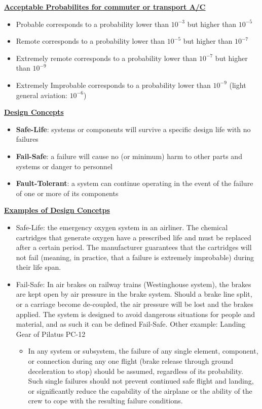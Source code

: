 \documentclass[9pt, landscape, fleqn]{scrartcl}
\begin{document}
\begin{multicols*}{3}
\begin{itemize}
\end{itemize}
\underline{\textbf{Acceptable Probabilites for commuter or transport A/C}}
\begin{itemize}
    \item Probable corresponds to a probability lower than $10^{-3}$ but higher than $10^{-5}$
    \item Remote corresponds to a probability lower than $10^{-5}$ but higher than $10^{-7}$
    \item Extremely remote corresponds to a probability lower than $10^{-7}$ but higher than $10^{-9}$
    \item Extremely Improbable corresponds to a probability lower than $10^{-9}$ (light general aviation: $10^{-6}$)
\end{itemize}
\underline{\textbf{Design Concepts}}
\begin{itemize}
    \item \textbf{Safe-Life}: systems or components will survive a specific design life with no failures
    \item \textbf{Fail-Safe}: a failure will cause no (or minimum) harm to other parts and systems or danger to
    personnel
    \item \textbf{Fault-Tolerant}: a system can continue operating in the event of the failure of one or more of its components
\end{itemize}
\underline{\textbf{Examples of Design Concetps}}
\begin{itemize}
    \item Safe-Life: the emergency oxygen system in an airliner. The chemical cartridges that generate oxygen have a prescribed life and must be replaced after a certain period. The manufacturer guarantees that the cartridges will not fail (meaning, in practice, that a failure is extremely improbable) during their life span.
    \item Fail-Safe: In air brakes on railway trains (Westinghouse system), the brakes are kept open by air pressure in the brake system. Should a brake line split, or a carriage become de-coupled, the air pressure will be lost and the brakes applied. The system is designed to avoid dangerous situations for people and material, and as such it can be defined Fail-Safe. Other example: Landing Gear of Pilatus PC-12
    \begin{itemize}
        \item In any system or subsystem, the failure of any single element, component, or connection during any one flight (brake release through ground deceleration to stop) should be assumed, regardless of its probability. Such single failures should not prevent continued safe flight and landing, or significantly reduce the capability of the airplane or the ability of the crew to cope with the resulting failure conditions.

\end{itemize}
\end{itemize}
\end{multicols*}
\end{document}
